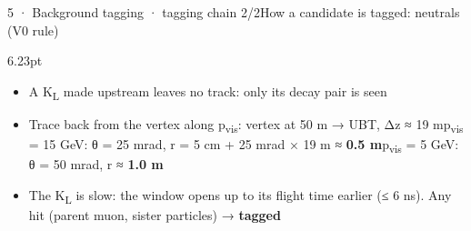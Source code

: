 \begin{btframe}{5 · Background tagging · tagging chain 2/2}{How a candidate is tagged: neutrals (V0 rule)}
\begin{minipage}[c]{0.45\linewidth}
\begin{mathbox}[purple]{6.23pt}
\end{mathbox}
{\fontsize{6.55pt}{7.37pt}\selectfont
\begin{itemize}
  \item A K\textsubscript{L} made upstream leaves no track: only its decay pair is seen
  \item Trace back from the vertex along p\textsubscript{vis}: vertex at 50 m → UBT, Δz ≈ 19 m\newline{}p\textsubscript{vis} = 15 GeV: θ = 25 mrad, r = 5 cm + 25 mrad × 19 m ≈ \textbf{0.5 m}\newline{}p\textsubscript{vis} = 5 GeV: θ = 50 mrad, r ≈ \textbf{1.0 m}
  \item The K\textsubscript{L} is slow: the window opens up to its flight time earlier (≤ 6 ns). Any hit (parent muon, sister particles) → \textbf{tagged}
\end{itemize}}
\end{minipage}\par
\vspace{2.46pt}

\end{btframe}


